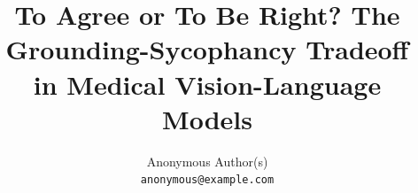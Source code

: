 \documentclass[10pt,twocolumn,letterpaper]{article}
\title{To Agree or To Be Right? The Grounding-Sycophancy Tradeoff\\in Medical Vision-Language Models}
\author{Anonymous Author(s)\\
{\tt\small anonymous@example.com}
}
\begin{document}
\maketitle









{
    \small
    
    
}
\end{document}
